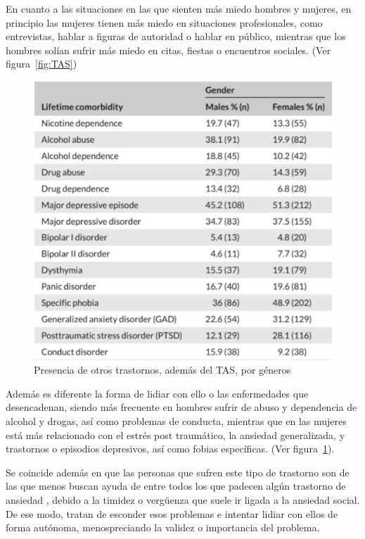 \documentclass[12pt, a4paper,twoside,titlepage]{book}
\begin{document}
\begin{itemize}
En cuanto a las situaciones en las que sienten más miedo hombres y mujeres, en principio las mujeres tienen más miedo en situaciones profesionales, como entrevistas, hablar a figuras de autoridad o hablar en público, mientras que los hombres solían sufrir más miedo en citas, fiestas o encuentros sociales. (Ver figura~\ref{fig:TAS})


\begin{figure}[tb]
	\centering
	\includegraphics[width=.9\linewidth]{TGF/Extra/TAS2.png}
	\caption{Presencia de otros trastornos, además del TAS, por géneros}
	\label{fig:TAS2}
\end{figure}


Además es diferente la forma de lidiar con ello o las enfermedades que desencadenan, siendo más frecuente en hombres sufrir de abuso y dependencia de alcohol y drogas, así como problemas de conducta, mientras que en las mujeres está más relacionado con el estrés post traumático, la ansiedad generalizada, y trastornos o episodios depresivos, así como fobias específicas. (Ver figura~\ref{fig:TAS2}).

Se coincide además en que las personas que sufren este tipo de trastorno son de las que menos buscan ayuda de entre todos los que padecen algún trastorno de ansiedad \cite{articuloTAS2}, debido a la timidez o vergüenza que suele ir ligada a la ansiedad social. De ese modo, tratan de esconder esos problemas e intentar lidiar con ellos de forma autónoma, menospreciando la validez o importancia del problema. 


\end{itemize}
\end{document}
